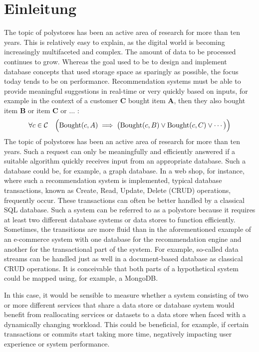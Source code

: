 

\chapter{Einleitung}
\label{ch:intro}
The topic of polystores has been an active area of research for more than ten years. 
This is relatively easy to explain, as the digital world is becoming increasingly multifaceted and complex. 
The amount of data to be processed continues to grow. 
Whereas the goal used to be to design and implement database concepts that used storage space as sparingly as possible, 
the focus today tends to be on performance. 
Recommendation systems must be able to provide meaningful suggestions in real-time 
or very quickly based on inputs, for example in the context of 
a customer $\mathbf{C}$ bought item $\mathbf{A}$, then they also bought item $\mathbf{B}$ or item $\mathbf{C}$ or $\ldots$
:
\[
\forall c \in \mathcal{C} \quad \Bigl( \text{Bought}(c, A) \implies \bigl( \text{Bought}(c, B) \lor \text{Bought}(c, C) \lor \cdots \bigr) \Bigr)
\]
The topic of polystores has been an active area of research for more than ten years. 
Such a request can only be meaningfully and efficiently answered if a suitable algorithm quickly receives input from an appropriate database. 
Such a database could be, for example, a graph database. 
In a web shop, for instance, where such a recommendation system is implemented, typical database transactions, 
known as Create, Read, Update, Delete (CRUD) operations, frequently occur. 
These transactions can often be better handled by a classical SQL database.
Such a system can be referred to as a polystore because it requires at least two different database systems 
or data stores to function efficiently. 
Sometimes, the transitions are more fluid than in the aforementioned example of an e-commerce system 
with one database for the recommendation engine and another for the transactional part of the system. 
For example, so-called data streams can be handled just as well in a document-based database as classical CRUD operations. 
It is conceivable that both parts of a hypothetical system could be mapped using, for example, a MongoDB.

\noindent In this case, it would be sensible to measure whether a system consisting of two or more different services 
that share a data store or database system would benefit from reallocating services or datasets to a data store when 
faced with a dynamically changing workload. 
This could be beneficial, for example, if certain transactions or commits start taking more time, negatively 
impacting user experience or system performance.\newline

